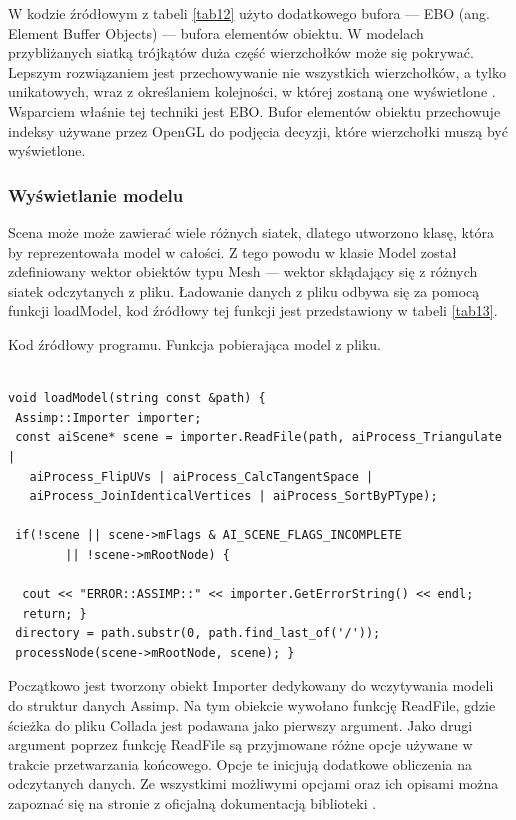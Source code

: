 W kodzie źródłowym z tabeli \ref{tab12} użyto dodatkowego bufora --- EBO (ang. Element Buffer Objects) --- bufora elementów obiektu. W modelach przybliżanych siatką trójkątów duża część wierzchołków może się pokrywać. Lepszym rozwiązaniem jest przechowywanie nie wszystkich wierzchołków, a tylko unikatowych, wraz z określaniem kolejności, w której zostaną one wyświetlone \cite{learnopengl}. Wsparciem właśnie tej techniki jest EBO. Bufor elementów obiektu przechowuje indeksy używane przez OpenGL do podjęcia decyzji, które wierzchołki muszą być wyświetlone.

\subsubsection{Wyświetlanie modelu}
Scena może może zawierać wiele różnych siatek, dlatego utworzono klasę, która by reprezentowała model w całości. Z tego powodu w klasie Model został zdefiniowany wektor obiektów typu Mesh --- wektor skłądający się z różnych siatek odczytanych z pliku. Ładowanie danych z pliku odbywa się za pomocą funkcji loadModel, kod źródłowy tej funkcji jest przedstawiony w tabeli \ref{tab13}.

\begin{table}[H]
\caption{Kod źródłowy programu. Funkcja pobierająca model z pliku.}
\label{tab13}
\begin{lstlisting}[frame=single]  % Start your code-block

void loadModel(string const &path) {
 Assimp::Importer importer;
 const aiScene* scene = importer.ReadFile(path, aiProcess_Triangulate |
   aiProcess_FlipUVs | aiProcess_CalcTangentSpace | 
   aiProcess_JoinIdenticalVertices | aiProcess_SortByPType);

 if(!scene || scene->mFlags & AI_SCENE_FLAGS_INCOMPLETE 
    	|| !scene->mRootNode) {
  
  cout << "ERROR::ASSIMP::" << importer.GetErrorString() << endl;
  return; }
 directory = path.substr(0, path.find_last_of('/'));
 processNode(scene->mRootNode, scene); }
\end{lstlisting}
\end{table}

Początkowo jest tworzony obiekt Importer dedykowany do wczytywania modeli do struktur danych Assimp. Na tym obiekcie wywołano funkcję ReadFile, gdzie ścieżka do pliku Collada jest podawana jako pierwszy argument. Jako drugi argument poprzez funkcję ReadFile są przyjmowane różne opcje używane w trakcie przetwarzania końcowego. Opcje te inicjują dodatkowe obliczenia na odczytanych danych. Ze wszystkimi możliwymi opcjami oraz ich opisami można zapoznać się na stronie z oficjalną dokumentacją biblioteki \cite{assimpDocumentation}.

